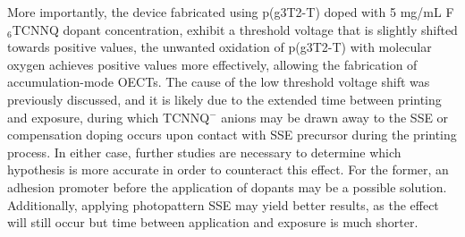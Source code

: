 More importantly, the device fabricated using p(g3T2-T) doped with 5 mg/mL F$_{6}$TCNNQ dopant concentration, exhibit a threshold voltage that is slightly shifted towards positive values, the unwanted oxidation of p(g3T2-T) with molecular oxygen achieves positive values more effectively, allowing the fabrication of accumulation-mode OECTs. The cause of the low threshold voltage shift was previously discussed, and it is likely due to the extended time between printing and exposure, during which TCNNQ$^{-}$ anions may be drawn away to the SSE or compensation doping occurs upon contact with SSE precursor during the printing process. In either case, further studies are necessary to determine which hypothesis is more accurate in order to counteract this effect. For the former, an adhesion promoter before the application of dopants may be a possible solution. Additionally, applying photopattern SSE may yield better results, as the effect will still occur but time between application and exposure is much shorter.



 


